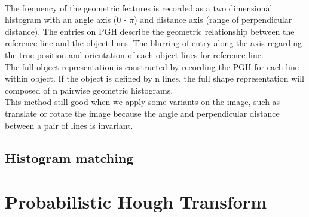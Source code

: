 \\[0.3cm]The frequency of the geometric features is recorded as a two dimensional histogram with an angle axis (0 - $\pi$) and distance axis (range of perpendicular distance). The entries on PGH describe the geometric relationship between the reference line and the object lines. The blurring of entry along the axis regarding the true position and orientation of each object lines for reference line.
\\The full object representation is constructed by recording the PGH for each line within object. If the object is defined by n lines, the full shape representation will composed of n pairwise geometric histograms.\\
This method still good when we apply some variants on the image, such as translate or rotate the image because the angle and perpendicular distance between a pair of lines is invariant.
\subsection{Histogram matching}
\section{Probabilistic Hough Transform}































